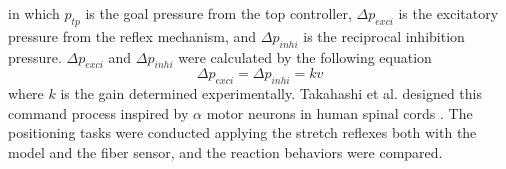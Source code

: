 in which $p_{tp}$ is the goal pressure from the top controller, $\Delta p_{exci}$ is the excitatory pressure from the reflex mechanism, and $ \Delta p_{inhi}$ is the reciprocal inhibition pressure. 
$\Delta p_{exci}$ and $\Delta p_{inhi}$ were calculated by the following equation
\begin{equation}
    \label{eq:reflex_pressure}
    \Delta p_{exci} =  \Delta p_{inhi} = kv
\end{equation}
where $k$ is the gain determined experimentally.
Takahashi et al. designed this command process inspired by $\alpha$ motor neurons in human spinal cords \cite{takahashi}. The positioning tasks were conducted applying the stretch reflexes both with the model and the fiber sensor, and the reaction behaviors were compared.
